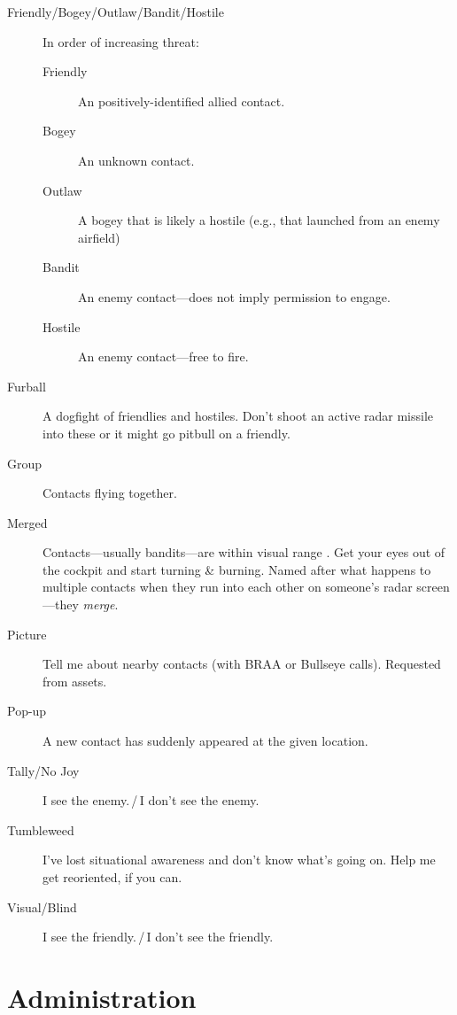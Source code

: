 \begin{description}
\item[Friendly/Bogey/Outlaw/Bandit/Hostile]
    In order of increasing threat:
    \begin{description}
    \item[Friendly] An positively-identified allied contact.
    \item[Bogey] An unknown contact.
    \item[Outlaw] A bogey that is likely a hostile
        (e.g., that launched from an enemy airfield)
    \item[Bandit] An enemy contact---does not imply permission to engage.
    \item[Hostile] An enemy contact---free to fire.
    \end{description}

\item[Furball] A dogfight of friendlies and hostiles.
    Don't shoot an active radar missile into these or it might go pitbull
    on a friendly.

\item[Group] Contacts flying together.

\item[Merged] Contacts---usually bandits---are within visual range
    .
    Get your eyes out of the cockpit and start turning \& burning.
    Named after what happens to multiple contacts when they run into each other
    on someone's radar screen---they \emph{merge}.

\item[Picture] Tell me about nearby contacts (with BRAA or Bullseye calls).
    Requested from  assets.

\item[Pop-up] A new contact has suddenly appeared at the given location.

\item[Tally/No Joy] I see the enemy.\,/\,I don't see the enemy.

\item[Tumbleweed] I've lost situational awareness 
    and don't know what's going on.
    Help me get reoriented, if you can.

\item[Visual/Blind] I see the friendly.\,/\,I don't see the friendly.
\end{description}

\section{Administration}

